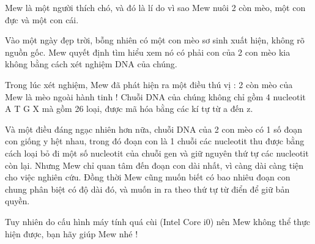 Mew là một người thích chó, và đó là lí do vì sao Mew nuôi 2 còn mèo, một con đực và một con cái.  

   Vào một ngày đẹp trời, bỗng nhiên có một con mèo sơ sinh xuất hiện, không rõ nguồn gốc. Mew quyết định tìm hiểu xem nó có phải con của 2 con mèo kia không bằng cách xét nghiệm DNA của chúng.  

   Trong lúc xét nghiệm, Mew đã phát hiện ra một điều thú vị : 2 còn mèo của Mew là mèo ngoài hành tinh ! Chuỗi DNA của chúng không chỉ gồm 4 nucleotit A T G X mà gồm 26 loại, được mã hóa bằng các kí tự từ a đến z.  

   Và một điều đáng ngạc nhiên hơn nữa, chuỗi DNA của 2 con mèo có 1 số đoạn con giống y hệt nhau, trong đó đoạn con là 1 chuỗi các nucleotit thu được bằng cách loại bỏ đi một số nucleotit của chuỗi gen và giữ nguyên thứ tự các nucleotit còn lại. Nhưng Mew chỉ quan tâm đến đoạn con dài nhất, vì càng dài càng tiện cho việc nghiên cứu. Đồng thời Mew cũng muốn biết có bao nhiêu đoạn con chung phân biệt có độ dài đó, và muốn in ra theo thứ tự từ điển để giữ bản quyền.  

   Tuy nhiên do cấu hình máy tính quá cùi (Intel Core i0) nên Mew không thể thực hiện được, bạn hãy giúp Mew nhé !